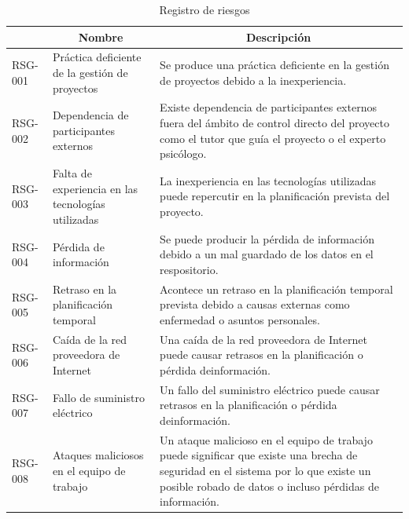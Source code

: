 \begin{table}[htpb]
\centering
\begin{tabularx}{\textwidth}{|l|X|X|}
\hline
\rowcolor[gray]{0.9}\multicolumn{1}{|c|}{\textbf{Identificador}} & \multicolumn{1}{c|}{\textbf{Nombre}}                        & \multicolumn{1}{c|}{\textbf{Descripción}}                                                                                                                                                              \\ \hline
RSG-001                             & Práctica deficiente de la gestión de proyectos     & Se produce una práctica deficiente en la gestión de proyectos debido a la inexperiencia.                                                                                                      \\ \hline
RSG-002                             & Dependencia de participantes externos              & Existe dependencia de participantes externos fuera del ámbito de control directo del proyecto como el tutor que guía el proyecto o el experto psicólogo.                                      \\ \hline
RSG-003                             & Falta de experiencia en las tecnologías utilizadas & La inexperiencia en las tecnologías utilizadas puede repercutir en la planificación prevista del proyecto.                                                                                    \\ \hline
RSG-004                             & Pérdida de información                             & Se puede producir la pérdida de información debido a un mal guardado de los datos en el respositorio.                                                                                         \\ \hline
RSG-005                             & Retraso en la planificación temporal               & Acontece un retraso en la planificación temporal prevista debido a causas externas como enfermedad o asuntos personales.                                                                      \\ \hline
RSG-006                             & Caída de la red proveedora de Internet             & Una caída de la red proveedora de Internet puede causar retrasos en la planificación o pérdida deinformación.                                                                                 \\ \hline
RSG-007                             & Fallo de suministro eléctrico                      & Un fallo del suministro eléctrico  puede causar retrasos en la planificación o pérdida deinformación.                                                                                         \\ \hline
RSG-008                             & Ataques maliciosos en el equipo de trabajo         & Un ataque malicioso en el equipo de trabajo puede significar que existe una brecha de seguridad en el sistema por lo que existe un posible robado de datos o incluso pérdidas de información. \\ \hline
\end{tabularx}
\caption{Registro de riesgos}
\label{tab_reg_riesgos}
\end{table}

